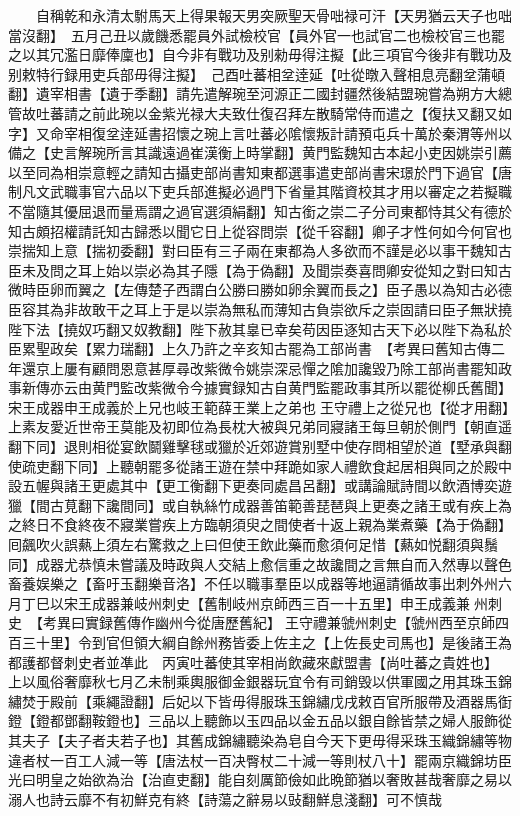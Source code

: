 　　自稱乾和永清太駙馬天上得果報天男突厥聖天骨咄禄可汗【天男猶云天子也咄當沒翻】　五月己丑以歲饑悉罷員外試檢校官【員外官一也試官二也檢校官三也罷之以其冗濫日靡俸廩也】自今非有戰功及别勑毋得注擬【此三項官今後非有戰功及别敕特行録用吏兵部毋得注擬】　己酉吐蕃相坌逹延【吐從暾入聲相息亮翻坌蒲頓翻】遺宰相書【遺于季翻】請先遣解琬至河源正二國封疆然後結盟琬嘗為朔方大總管故吐蕃請之前此琬以金紫光禄大夫致仕復召拜左散騎常侍而遣之【復扶又翻又如字】又命宰相復坌逹延書招懷之琬上言吐蕃必隂懷叛計請預屯兵十萬於秦渭等州以備之【史言解琬所言其識遠過崔漢衡上時掌翻】黄門監魏知古本起小吏因姚崇引薦以至同為相崇意輕之請知古攝吏部尚書知東都選事遣吏部尚書宋璟於門下過官【唐制凡文武職事官六品以下吏兵部進擬必過門下省量其階資校其才用以審定之若擬職不當隨其優屈退而量焉謂之過官選須絹翻】知古銜之崇二子分司東都恃其父有德於知古頗招權請託知古歸悉以聞它日上從容問崇【從千容翻】卿子才性何如今何官也崇揣知上意【揣初委翻】對曰臣有三子兩在東都為人多欲而不謹是必以事干魏知古臣未及問之耳上始以崇必為其子隱【為于偽翻】及聞崇奏喜問卿安從知之對曰知古微時臣卵而翼之【左傳楚子西謂白公勝曰勝如卵余翼而長之】臣子愚以為知古必德臣容其為非故敢干之耳上于是以崇為無私而薄知古負崇欲斥之崇固請曰臣子無狀撓陛下法【撓奴巧翻又奴教翻】陛下赦其辠已幸矣苟因臣逐知古天下必以陛下為私於臣累聖政矣【累力瑞翻】上久乃許之辛亥知古罷為工部尚書　【考異曰舊知古傳二年還京上屢有顧問恩意甚厚尋改紫微令姚崇深忌憚之隂加讒毀乃除工部尚書罷知政事新傳亦云由黄門監改紫微令今據實録知古自黄門監罷政事其所以罷從柳氏舊聞】　宋王成器申王成義於上兄也岐王範薛王業上之弟也王守禮上之從兄也【從才用翻】上素友愛近世帝王莫能及初即位為長枕大被與兄弟同寢諸王每旦朝於側門【朝直遥翻下同】退則相從宴飲鬬雞擊毬或獵於近郊遊賞别墅中使存問相望於道【墅承與翻使疏吏翻下同】上聽朝罷多從諸王遊在禁中拜跪如家人禮飲食起居相與同之於殿中設五幄與諸王更處其中【更工衡翻下更奏同處昌呂翻】或講論賦詩間以飲酒博奕遊獵【間古莧翻下讒間同】或自執絲竹成器善笛範善琵琶與上更奏之諸王或有疾上為之終日不食終夜不寢業嘗疾上方臨朝須臾之間使者十返上親為業煮藥【為于偽翻】囘飆吹火誤爇上須左右驚救之上曰但使王飲此藥而愈須何足惜【爇如悦翻須與鬚同】成器尤恭慎未嘗議及時政與人交結上愈信重之故讒間之言無自而入然專以聲色畜養娱樂之【畜吁玉翻樂音洛】不任以職事羣臣以成器等地逼請循故事出刺外州六月丁巳以宋王成器兼岐州刺史【舊制岐州京師西三百一十五里】申王成義兼州刺史　【考異曰實録舊傳作幽州今從唐歷舊紀】王守禮兼虢州刺史【虢州西至京師四百三十里】令到官但領大綱自餘州務皆委上佐主之【上佐長史司馬也】是後諸王為都護都督刺史者並凖此　丙寅吐蕃使其宰相尚飲藏來獻盟書【尚吐蕃之貴姓也】　上以風俗奢靡秋七月乙未制乘輿服御金銀器玩宜令有司銷毁以供軍國之用其珠玉錦繡焚于殿前【乘繩證翻】后妃以下皆毋得服珠玉錦繡戊戌敕百官所服帶及酒器馬衘鐙【鐙都鄧翻鞍鐙也】三品以上聽飾以玉四品以金五品以銀自餘皆禁之婦人服飾從其夫子【夫子者夫若子也】其舊成錦繡聽染為皂自今天下更毋得采珠玉織錦繡等物違者杖一百工人減一等【唐法杖一百决臀杖二十減一等則杖八十】罷兩京織錦坊臣光曰明皇之始欲為治【治直吏翻】能自刻厲節儉如此晩節猶以奢敗甚哉奢靡之易以溺人也詩云靡不有初鮮克有終【詩蕩之辭易以䜴翻鮮息淺翻】可不慎哉

